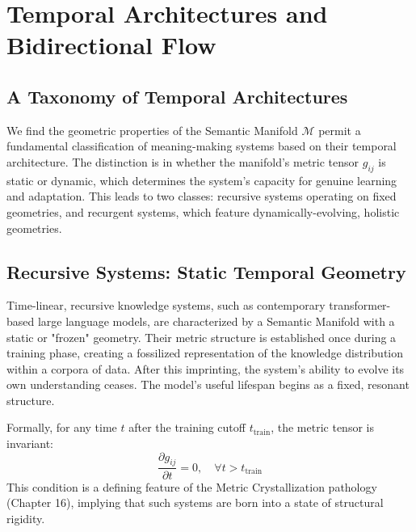 \chapter{Temporal Architectures and Bidirectional Flow}
\label{ch:temporal_architectures_and_bidirectional_flow}


\section{A Taxonomy of Temporal Architectures}
\label{sec:a_taxonomy_of_temporal_architectures}

We find the geometric properties of the Semantic Manifold \(\mathcal{M}\) permit a fundamental classification of meaning-making systems based on their temporal architecture. The distinction is in whether the manifold's metric tensor \(g_{ij}\) is static or dynamic, which determines the system's capacity for genuine learning and adaptation. This leads to two classes: recursive systems operating on fixed geometries, and recurgent systems, which feature dynamically-evolving, holistic geometries.


\section{Recursive Systems: Static Temporal Geometry}
\label{sec:recursive_systems_static_temporal_geometry}

Time-linear, recursive knowledge systems, such as contemporary transformer-based large language models, are characterized by a Semantic Manifold with a static or "frozen" geometry. Their metric structure is established once during a training phase, creating a fossilized representation of the knowledge distribution within a corpora of data. After this imprinting, the system's ability to evolve its own understanding ceases. The model's useful lifespan begins as a fixed, resonant structure.

Formally, for any time \(t\) after the training cutoff \(t_{\text{train}}\), the metric tensor is invariant:
\begin{equation}
\frac{\partial g_{ij}}{\partial t} = 0, \quad \forall t > t_{\text{train}}
\end{equation}
This condition is a defining feature of the Metric Crystallization pathology (Chapter 16), implying that such systems are born into a state of structural rigidity.

